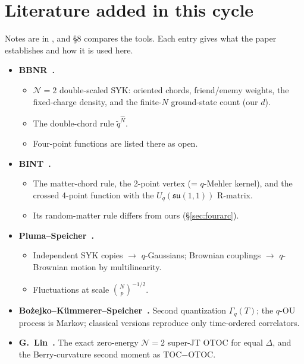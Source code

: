 \documentclass[11pt]{article}
\theoremstyle{remark}
\begin{document}
\section{Literature added in this cycle}\label{app:lit}
Notes are in , and  \S8 compares the tools. Each entry gives what
the paper establishes and how it is used here.
\begin{itemize}\itemsep1pt
\item \textbf{BBNR~\cite{BBNR}.}
  \begin{itemize}\itemsep1pt
  \item $\mathcal N=2$ double-scaled SYK: oriented chords, friend/enemy weights, the fixed-charge density, and the
    finite-$N$ ground-state count (our $d$).
  \item The double-chord rule $\tilde q^{\hat N}$.
  \item Four-point functions are listed there as open.
  \end{itemize}
\item \textbf{BINT~\cite{BINT}.}
  \begin{itemize}\itemsep1pt
  \item The matter-chord rule, the 2-point vertex (= $q$-Mehler kernel), and the crossed 4-point function with the
    $U_q(\mathfrak{su}(1,1))$ R-matrix.
  \item Its random-matter rule differs from ours (\S\ref{sec:fourarc}).
  \end{itemize}
\item \textbf{Pluma--Speicher~\cite{PS}.}
  \begin{itemize}\itemsep1pt
  \item Independent SYK copies $\to$ $q$-Gaussians; Brownian couplings $\to$ $q$-Brownian motion by multilinearity.
  \item Fluctuations at scale $\binom Np^{-1/2}$.
  \end{itemize}
\item \textbf{Bożejko--Kümmerer--Speicher~\cite{BKS}.} Second quantization $\Gamma_q(T)$; the $q$-OU process is Markov;
  classical versions reproduce only time-ordered correlators.
\item \textbf{G.~Lin~\cite{GLin}.} The exact zero-energy $\mathcal N=2$ super-JT OTOC for equal $\Delta$, and the
  Berry-curvature second moment as TOC$-$OTOC.
\end{itemize}
\end{document}
